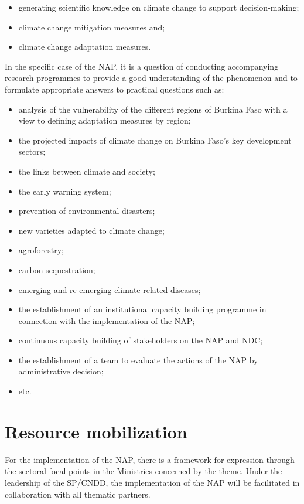 \documentclass[
]{book}
\begin{document}
\begin{itemize}
\item
  generating scientific knowledge on climate change to support decision-making;
\item
  climate change mitigation measures and;
\item
  climate change adaptation measures.
\end{itemize}

In the specific case of the NAP, it is a question of conducting accompanying research programmes to provide a good understanding of the phenomenon and to formulate appropriate answers to practical questions such as:

\begin{itemize}
\item
  analysis of the vulnerability of the different regions of Burkina Faso with a view to defining adaptation measures by region;
\item
  the projected impacts of climate change on Burkina Faso's key development sectors;
\item
  the links between climate and society;
\item
  the early warning system;
\item
  prevention of environmental disasters;
\item
  new varieties adapted to climate change;
\item
  agroforestry;
\item
  carbon sequestration;
\item
  emerging and re-emerging climate-related diseases;
\item
  the establishment of an institutional capacity building programme in connection with the implementation of the NAP;
\item
  continuous capacity building of stakeholders on the NAP and NDC;
\item
  the establishment of a team to evaluate the actions of the NAP by administrative decision;
\item
  etc.
\end{itemize}

\section{Resource mobilization}\label{resource-mobilization}

For the implementation of the NAP, there is a framework for expression through the sectoral focal points in the Ministries concerned by the theme. Under the leadership of the SP/CNDD, the implementation of the NAP will be facilitated in collaboration with all thematic partners.
\end{document}
